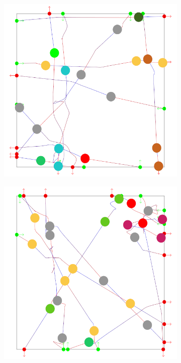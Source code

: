 \begin{figure}[t]
\begin{subfigure}[b]{0.24\linewidth}
 	\caption{}
 \end{subfigure}
 \begin{subfigure}[b]{0.24\linewidth}
 	\includegraphics[width=\linewidth]{images/res-10-withAgents_3.png}
 	\caption{}
 \end{subfigure}
 \begin{subfigure}[b]{0.24\linewidth}
 	\includegraphics[width=\linewidth]{images/res-10-withAgents_4.png}

\end{subfigure}
\end{figure}
